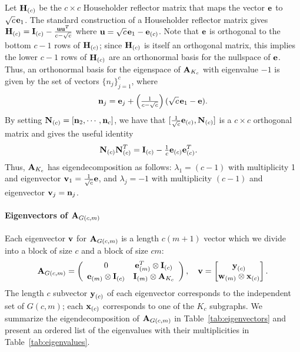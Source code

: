 Let $\textbf{H}_{(c)}$ be the $c \times c$ Householder reflector matrix that maps the vector $\textbf{e}$ to $\sqrt{c}\hspace{1pt} \textbf{e}_1$.
The standard construction of a Householder reflector matrix gives $\textbf{H}_{(c)} = \textbf{I}_{(c)} - \tfrac{\textbf{u}\textbf{u}^T}{c - \sqrt{c}}$ where $\textbf{u} = \sqrt{c}\hspace{1pt}\textbf{e}_1 - \textbf{e}_{(c)}$.
Note that $\textbf{e}$ is orthogonal to the bottom $c-1$ rows of $\textbf{H}_{(c)}$; since $\textbf{H}_{(c)}$ is itself an orthogonal matrix, this implies the lower $c-1$ rows of $\textbf{H}_{(c)}$ are an orthonormal basis for the nullspace of $\textbf{e}$.
Thus, an orthonormal basis for the eigenspace of $\textbf{A}_{K_c}$ with eigenvalue $-1$ is given by the set of vectors $\{n_j\}_{j=1}^{c}$, where
\[
    \textbf{n}_j = \textbf{e}_j + \left(\tfrac{1}{c - \sqrt{c}}\right)( \sqrt{c}\hspace{1pt}\textbf{e}_1 - \textbf{e}).
\]
By setting $\textbf{N}_{(c)} = [\textbf{n}_2, \cdots, \textbf{n}_c ]$, we have that
 $[ \tfrac{1}{\sqrt{c}} \textbf{e}_{(c)},  \textbf{N}_{(c)} ]$ is a $c\times c$ orthogonal matrix and gives the useful identity
\begin{align}\label{eqn:N-property}
    \textbf{N}_{(c)}\textbf{N}_{(c)}^T &= \textbf{I}_{(c)} - \tfrac{1}{c} \textbf{e}_{(c)}\textbf{e}_{(c)}^T.
\end{align}
Thus, $\textbf{A}_{K_c}$ has eigendecomposition as follows:
  $\lambda_1 = (c-1)$ with multiplicity 1 and eigenvector $\textbf{v}_1 = \tfrac{1}{\sqrt{c}} \textbf{e}$, and
  $\lambda_j = -1$ with multiplicity $(c-1)$ and eigenvector $\textbf{v}_j = \textbf{n}_j$.

\paragraph{Eigenvectors of $\textbf{A}_{G(c,m)}$}
Each eigenvector $\textbf{v}$ for $\textbf{A}_{G(c,m)}$ is a length $c(m+1)$ vector which we divide into a block of size $c$ and a block of size $cm$:
\[
    \textbf{A}_{G(c,m)} =
    \left(
        \begin{array}{cc}
            0 & \textbf{e}_{(m)}^T \otimes \textbf{I}_{(c)} \\
            \textbf{e}_{(m)} \otimes \textbf{I}_{(c)} & \textbf{I}_{(m)} \otimes \textbf{A}_{K_c}
        \end{array}
    \right), \quad
    \textbf{v} = \begin{bmatrix}  \textbf{y}_{(c)} \\ \textbf{w}_{(m)} \otimes \textbf{x}_{(c)}  \end{bmatrix}.
\]
The length $c$ subvector $\textbf{y}_{(c)}$ of each eigenvector corresponds to the independent set of $G(c,m)$; each $\textbf{x}_{(c)}$ corresponds to one of the $K_c$ subgraphs.
We summarize the eigendecomposition of $\textbf{A}_{G(c,m)}$ in Table~\ref{tab:eigenvectors} and present an ordered list of the eigenvalues with their multiplicities in Table~\ref{tab:eigenvalues}.


